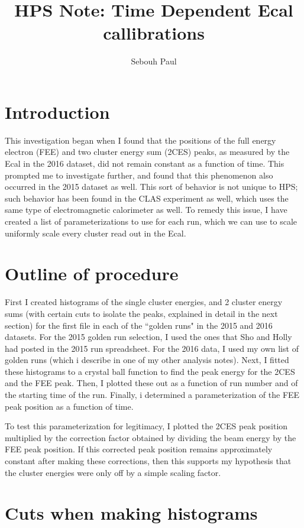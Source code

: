 \documentclass[11pt]{article}
\title{HPS Note:  Time Dependent Ecal callibrations}
\author{Sebouh Paul}
\date{}                                           %
\begin{document}
\maketitle
\section{Introduction}
This investigation began when I found that the positions of the full energy electron (FEE) and two cluster energy sum (2CES) peaks, as measured by the Ecal in the 2016 dataset, did not remain constant as a function of time.   This prompted me to investigate further, and found that this phenomenon also occurred in the 2015 dataset as well.  This sort of behavior is not unique to HPS; such behavior has been found in the CLAS experiment as well, which uses the same type of electromagnetic calorimeter as well.  To remedy this issue, I have created a list of parameterizations to use for each run, which we can use to scale uniformly scale every cluster read out in the Ecal.  

\section{Outline of procedure}
First I created histograms of the single cluster energies, and 2 cluster energy sums (with certain cuts to isolate the peaks, explained in detail in the next section) for the first file in each of the ``golden runs" in the 2015 and 2016 datasets.  For the 2015 golden run selection, I used the ones that Sho and Holly had posted in the 2015 run spreadsheet.  For the 2016 data, I used my own list of golden runs (which i describe in one of my other analysis notes).  Next, I fitted these histograms to a crystal ball function to find the peak energy for the 2CES and the FEE peak.  Then, I plotted these out as a function of run number and of the starting time of the run.  Finally, i determined a parameterization of the FEE peak position as a function of time.   

To test this parameterization for legitimacy, I plotted the 2CES peak position multiplied by the correction factor obtained by dividing the beam energy by the FEE peak position.  If this corrected peak position remains approximately constant after making these corrections, then this supports my hypothesis that the cluster energies were only off by a simple scaling factor.  

\section{Cuts when making histograms}
\end{document}
